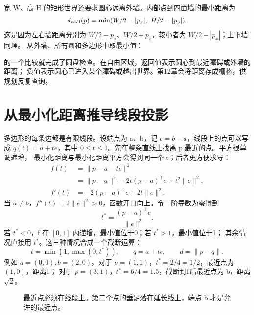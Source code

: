 宽 W、高 H 的矩形世界还要求圆心远离外墙。内部点到四面墙的最小距离为
\begin{equation}
d_{\rm wall}(p)=\min(W/2-|p_x|,\ H/2-|p_y|).
\end{equation}
这是因为左右墙距离分别为 $W/2-p_x$、$W/2+p_x$，较小者为 $W/2-|p_x|$；上下墙同理。
 从外墙、所有圆和多边形中取最小值：
\par\noindent\begin{minipage}{\linewidth}

\end{minipage}\par
{} 的一个比较就完成了圆盘检查。在自由区域，返回值表示圆心到最近障碍或外墙的距离；
负值表示圆心已进入某个障碍或越出世界。第12章会将距离存成栅格，供规划反复查询。

\section{从最小化距离推导线段投影}
多边形的每条边都是有限线段。设端点为 a、b，记 $e=b-a$，线段上的点可以写成
$q(t)=a+te$，其中 $0\leq t\leq1$。先在整条直线上找离 p 最近的点。平方根单调递增，
最小化距离与最小化距离平方会得到同一个 t；后者更方便求导：
\begin{align}
f(t)&=\|p-a-te\|^2\\
 &=\|p-a\|^2-2t(p-a)^\top e+t^2\|e\|^2,\\
f'(t)&=-2(p-a)^\top e+2t\|e\|^2.
\end{align}
当 $a\ne b$，$f''(t)=2\|e\|^2>0$，函数开口向上。令一阶导数为零得到
\begin{equation}
t^*=\frac{(p-a)^\top e}{\|e\|^2}.
\end{equation}
若 $t^*<0$，f 在 $[0,1]$ 内递增，最小值位于0；若 $t^*>1$，最小值位于1；
其余情况直接用 $t^*$。这三种情况合成一个截断运算：
\begin{equation}
t=\min(1,\max(0,t^*)),\qquad q=a+te,\qquad d=\|p-q\|.
\end{equation}
例如 $a=(0,0),b=(2,0)$。对于 $p=(1,1)$，$t^*=2/4=1/2$，最近点为 $(1,0)$，距离1；
对于 $p=(3,1)$，$t^*=6/4=1.5$，截断到1后最近点为 b，距离 $\sqrt2$。
\begin{figure}[ht]
\centering
{}
\caption{最近点必须在线段上。第二个点的垂足落在延长线上，端点 b 才是允许的最近点。}
\end{figure}

